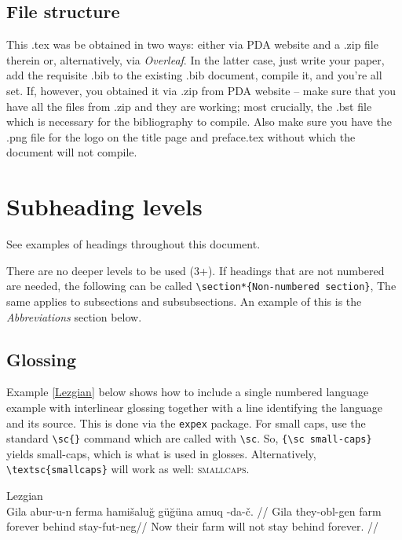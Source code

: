 \documentclass{article}
\begin{document}
\subsection{File structure}
This .tex was be obtained in two ways: either via PDA website and a .zip file therein or, alternatively, via \textit{Overleaf}. In the latter case, just write your paper, add the requisite .bib to the existing .bib document, compile it, and you're all set. If, however, you obtained it via .zip from PDA website -- make sure that you have all the files from .zip and they are working; most crucially, the .bst file which is necessary for the bibliography to compile. Also make sure you have the .png file for the logo on the title page and preface.tex without which the document will not compile. 

\section{Subheading levels}
See examples of headings throughout this document.

There are no deeper levels to be used (3+). If headings that are not numbered are needed, the following can be called 
\pex 
\verb=\section*{Non-numbered section}=,
\xe 
The same applies to subsections and subsubsections. An example of this is the \textit{Abbreviations} section below.

\subsection{Glossing}\label{gloss}
Example \ref{Lezgian} below shows how to include a single numbered language example with interlinear glossing together with a line identifying the language and its source. This is done via the \verb=expex= package. For small caps, use the standard \verb=\sc{}= command which are called with \verb=\sc=. So, \verb={\sc small-caps}= yields {\sc small-caps}, which is what is used in glosses. Alternatively, \verb=\textsc{smallcaps}= will work as well: \textsc{smallcaps}.

\pex[everygla={},aboveglftskip=0em] \label{Lezgian} Lezgian \citep[from][207]{haspelmath_1993}\\
\begingl
\gla Gila abur-u-n ferma hami\v{s}alu\u{g} g\"{u}\u{g}\"{u}na amuq -da-\v{c}. //
\glb Gila they-{\sc obl}-{\sc gen} farm forever behind stay-{\sc fut}-{\sc neg}//
\glft  Now their farm will not stay behind forever. //
\endgl
\xe
\end{document}
